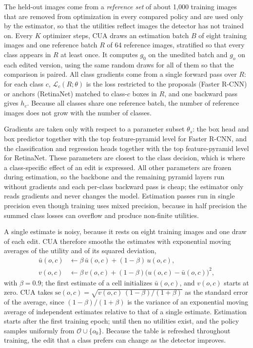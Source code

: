 \documentclass[conference]{IEEEtran}
\begin{document}
The held-out images come from a \emph{reference set} of about 1,000 training images that are removed from optimization in every compared policy and are used only by the estimator, so that the utilities reflect images the detector has not trained on. Every $K$ optimizer steps, CUA draws an estimation batch $B$ of eight training images and one reference batch $R$ of 64 reference images, stratified so that every class appears in $R$ at least once. It computes $g_0$ on the unedited batch and $g_o$ on each edited version, using the same random draws for all of them so that the comparison is paired. All class gradients come from a single forward pass over $R$: for each class $c$, $\mathcal{L}_c(R;\theta)$ is the loss restricted to the proposals (Faster R-CNN) or anchors (RetinaNet) matched to class-$c$ boxes in $R$, and one backward pass gives $h_c$. Because all classes share one reference batch, the number of reference images does not grow with the number of classes.

Gradients are taken only with respect to a parameter subset $\theta_s$: the box head and box predictor together with the top feature-pyramid level for Faster R-CNN, and the classification and regression heads together with the top feature-pyramid level for RetinaNet. These parameters are closest to the class decision, which is where a class-specific effect of an edit is expressed. All other parameters are frozen during estimation, so the backbone and the remaining pyramid layers run without gradients and each per-class backward pass is cheap; the estimator only reads gradients and never changes the model. Estimation passes run in single precision even though training uses mixed precision, because in half precision the summed class losses can overflow and produce non-finite utilities.

A single estimate is noisy, because it rests on eight training images and one draw of each edit. CUA therefore smooths the estimates with exponential moving averages of the utility and of its squared deviation,
\begin{align}
\bar u(o,c)&\leftarrow\beta\,\bar u(o,c)+(1-\beta)\,u(o,c),\label{eq:ema}\\
v(o,c)&\leftarrow\beta\,v(o,c)+(1-\beta)\bigl(u(o,c)-\bar u(o,c)\bigr)^2,\label{eq:var}
\end{align}
with $\beta=0.9$; the first estimate of a cell initializes $\bar u(o,c)$, and $v(o,c)$ starts at zero. CUA takes $\mathrm{se}(o,c)=\sqrt{v(o,c)\,(1-\beta)/(1+\beta)}$ as the standard error of the average, since $(1-\beta)/(1+\beta)$ is the variance of an exponential moving average of independent estimates relative to that of a single estimate. Estimation starts after the first training epoch; until then no utilities exist, and the policy samples uniformly from $\mathcal{O}\cup\{o_0\}$. Because the table is refreshed throughout training, the edit that a class prefers can change as the detector improves.
\end{document}
